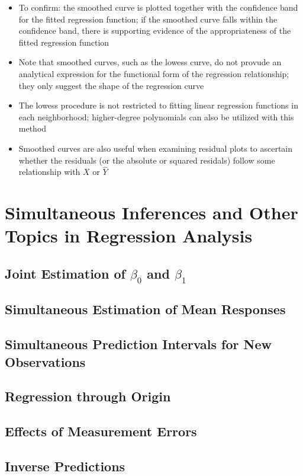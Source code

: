 \begin{itemize}
\item To confirm: the smoothed curve is plotted together with the confidence band for the fitted regression function; if the smoothed curve falls within the confidence band, there is supporting evidence of the appropriateness of the fitted regression function
\item Note that smoothed curves, such as the lowess curve, do not provude an analytical expression for the functional form of the regression relationship; they only suggest the shape of the regression curve
\item The lowess procedure is not restricted to fitting linear regression functions in each neighborhood; higher-degree polynomials can also be utilized with this method 
\item Smoothed curves are also useful when examining residual plots to ascertain whether the residuals (or the absolute or squared residals) follow some relationship with $X$ or $\hat{Y}$
\end{itemize} 


\section{Simultaneous Inferences and Other Topics in Regression Analysis}
\subsection{Joint Estimation of $\beta_0$ and $\beta_1$}

\subsection{Simultaneous Estimation of Mean Responses}

\subsection{Simultaneous Prediction Intervals for New Observations}

\subsection{Regression through Origin}

\subsection{Effects of Measurement Errors}

\subsection{Inverse Predictions}

